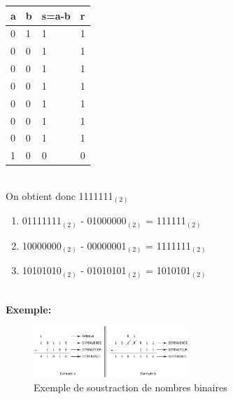 \begin{Exercice}[15 minutes]
\begin{solution}
\begin{tabular}{| C{0.1\textwidth} | C{0.1\textwidth} | C{0.1\textwidth} | C{0.1\textwidth} |} 
            \hline
            \textbf{a} & \textbf{b} & \textbf{s=a-b} & \textbf{r}\\ [0.5ex]
             & 1 & 1 & 1 \\ [0.5ex] 
             & 0 & 1 & 1 \\ [0.5ex] 
             & 0 & 1 & 1 \\ [0.5ex] 
             & 0 & 1 & 1 \\ [0.5ex] 
             & 0 & 1 & 1 \\ [0.5ex] 
             & 0 & 1 & 1 \\ [0.5ex] 
             & 0 & 1 & 1 \\ [0.5ex] 
             & 0 & 0 & 0 \\ [0.5ex] 
            \hline
        \end{tabular} \\
 		
 		On obtient donc 1111111$_{(2)}$ \\
 		
 		\begin{enumerate}
        \item 01111111$_{(2)}$ - 01000000$_{(2)}$ = 111111$_{(2)}$
        \item 10000000$_{(2)}$ - 00000001$_{(2)}$ = 1111111$_{(2)}$
        \item 10101010$_{(2)}$ - 01010101$_{(2)}$ = 1010101$_{(2)}$
    \end{enumerate}
    \end{solution}

    \textbf{\\ \faTerminal  Exemple:}
        \begin{figure}[h]
            \centering
            \includegraphics[width=0.52\textwidth]{img/substract.png}
            \caption{Exemple de soustraction de nombres binaires}
        \end{figure}

\end{Exercice}
\newpage
